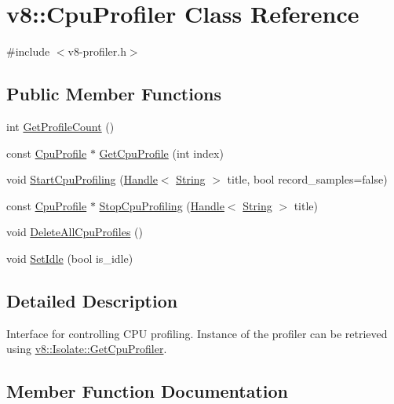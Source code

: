 \hypertarget{classv8_1_1_cpu_profiler}{}\section{v8\+:\+:Cpu\+Profiler Class Reference}
\label{classv8_1_1_cpu_profiler}


{\ttfamily \#include $<$v8-\/profiler.\+h$>$}

\subsection*{Public Member Functions}
\begin{DoxyCompactItemize}
\item 
int \hyperlink{classv8_1_1_cpu_profiler_af49a7c17dfdb194c8bbe2351519575d7}{Get\+Profile\+Count} ()
\item 
const \hyperlink{classv8_1_1_cpu_profile}{Cpu\+Profile} $\ast$ \hyperlink{classv8_1_1_cpu_profiler_a9f5b321b225ec9941290207cdd880ffb}{Get\+Cpu\+Profile} (int index)
\item 
void \hyperlink{classv8_1_1_cpu_profiler_a61b2b49010708f0283c1613e2bdc1adc}{Start\+Cpu\+Profiling} (\hyperlink{classv8_1_1_handle}{Handle}$<$ \hyperlink{classv8_1_1_string}{String} $>$ title, bool record\+\_\+samples=false)
\item 
const \hyperlink{classv8_1_1_cpu_profile}{Cpu\+Profile} $\ast$ \hyperlink{classv8_1_1_cpu_profiler_a531059626e708481ecb721a41a82a016}{Stop\+Cpu\+Profiling} (\hyperlink{classv8_1_1_handle}{Handle}$<$ \hyperlink{classv8_1_1_string}{String} $>$ title)
\item 
void \hyperlink{classv8_1_1_cpu_profiler_a73bc2fff59e78276025772a8380dc2ab}{Delete\+All\+Cpu\+Profiles} ()
\item 
void \hyperlink{classv8_1_1_cpu_profiler_a68e6da6f9ff4a0d3bde505f378a9a7fa}{Set\+Idle} (bool is\+\_\+idle)
\end{DoxyCompactItemize}


\subsection{Detailed Description}
Interface for controlling C\+P\+U profiling. Instance of the profiler can be retrieved using \hyperlink{classv8_1_1_isolate_a7eb415d9210d912aa57877ab6416fec8}{v8\+::\+Isolate\+::\+Get\+Cpu\+Profiler}. 

\subsection{Member Function Documentation}
\hypertarget{classv8_1_1_cpu_profiler_a73bc2fff59e78276025772a8380dc2ab}{}
